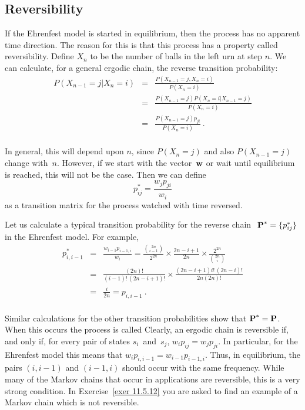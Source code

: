 \subsection*{Reversibility}
If the Ehrenfest model is started in equilibrium, then the process has no
apparent time
direction.  The reason for this is that this process has a property called \emx
{reversibility.}  Define $X_n$ to be the number of balls
in 
the left urn at step $n$.  We can calculate, for a general ergodic chain, the
reverse transition
probability:
\begin{eqnarray*}
P(X_{n - 1} = j | X_n = i) &=& \frac{P(X_{n - 1} = j,X_n = i)}{P(X_n = i)} \\
     &=& \frac{P(X_{n - 1} = j) P(X_n = i | X_{n - 1} = j)}{P(X_n = i)} \\
     &=& \frac{P(X_{n - 1} = j) p_{ji}}{P(X_n = i)}\ .\\
\end{eqnarray*}
\par
In general, this will depend upon $n$, since $P(X_n = j)$ and also $P(X_{n - 1}
= j)$ change with~$n$.  However, if we start with the vector~${\mbox{\bf w}\/}$ or wait
until equilibrium is reached, this will not be the case.  Then we can define
$$
p_{ij}^* = \frac{w_j p_{ji}}{w_i}
$$
as a transition matrix for the process watched with time reversed.
\par
Let us calculate a typical transition probability for the reverse chain $\mat{
P}^* = \{p_{ij}^*\}$ in the Ehrenfest model.  For example,
\begin{eqnarray*}
 p_{i,i - 1}^* &=& \frac{w_{i - 1} p_{i - 1,i}}{w_i} = 
\frac{{2n \choose {i - 1}}}{2^{2n}}
                  \times \frac{2n - i + 1}{2n} \times 
\frac{2^{2n}}{{2n \choose i}}\\
               &=& \frac{(2n)!}{(i - 1)!\,(2n - i + 1)!} \times 
\frac{(2n - i + 1) i!\,
                  (2n - i)!}{2n(2n)!} \\
               &=& \frac{i}{2n} = p_{i,i - 1}\ .\\
\end{eqnarray*}
\par
Similar calculations for the other transition probabilities show that ${\mbox{\bf P}\/}^*
= {\mbox{\bf P}\/}$.  When this occurs the process is called  
Clearly,
an ergodic chain is reversible if, and only if, for every pair of states
$s_i$~and~$s_j$, $w_i p_{ij} = w_j p_{ji}$.  In particular, for the Ehrenfest
model
this means that $w_i p_{i,i - 1} = w_{i - 1} p_{i - 1,i}$.  Thus, in
equilibrium, the pairs $(i, i - 1)$ and $(i - 1, i)$ should occur with the same
frequency.  While many of the Markov chains that occur in applications are
reversible, this is a very strong condition.  In Exercise~\ref{exer 11.5.12}
you 
are asked to find an example of a Markov chain which is not reversible.
 
